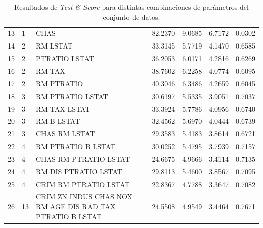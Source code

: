 \documentclass[11pt, letterpaper]{article}
\begin{document}
\begin{table}[h!]
\begin{adjustbox}{width=\textwidth}
\begin{tabular}{lllllll}
13          & 1          & CHAS                                                      & 82.2370      & 9.0685        & 6.7172       & 0.0302         \\
14          & 2          & RM LSTAT                                                  & 33.3145      & 5.7719        & 4.1470       & 0.6585         \\
15          & 2          & PTRATIO LSTAT                                             & 36.2053      & 6.0171        & 4.2816       & 0.6269         \\
16          & 2          & RM TAX                                                    & 38.7602      & 6.2258        & 4.0774       & 0.6095         \\
17          & 2          & RM PTRATIO                                                & 40.3046      & 6.3486        & 4.2659       & 0.6045         \\
18          & 3          & RM PTRATIO LSTAT                                          & 30.6197      & 5.5335        & 3.9051       & 0.7037         \\
19          & 3          & RM TAX LSTAT                                              & 33.3924      & 5.7786        & 4.0956       & 0.6740         \\
20          & 3          & RM B LSTAT                                                & 32.4562      & 5.6970        & 4.0444       & 0.6739         \\
21          & 3          & CHAS RM LSTAT                                             & 29.3583      & 5.4183        & 3.8614       & 0.6721         \\
22          & 4          & RM PTRATIO B LSTAT                                        & 30.0252      & 5.4795        & 3.7939       & 0.7157         \\
23          & 4          & CHAS RM PTRATIO LSTAT                                     & 24.6675      & 4.9666        & 3.4114       & 0.7135         \\
24          & 4          & RM DIS PTRATIO LSTAT                                      & 29.8113      & 5.4600        & 3.8567       & 0.7095         \\
25          & 4          & CRIM RM PTRATIO LSTAT                                     & 22.8367      & 4.7788        & 3.3647       & 0.7082         \\
26          & 13         & CRIM ZN INDUS CHAS NOX RM AGE DIS RAD TAX PTRATIO B LSTAT & 24.5508      & 4.9549        & 3.4464       & 0.7671         \\ \hline
\end{tabular}
\end{adjustbox}
\caption{Resultados de \textit{Test \& Score} para distintas combinaciones de parámetros del conjunto de datos.}
\label{tab:testscore}
\end{table}
\end{document}
